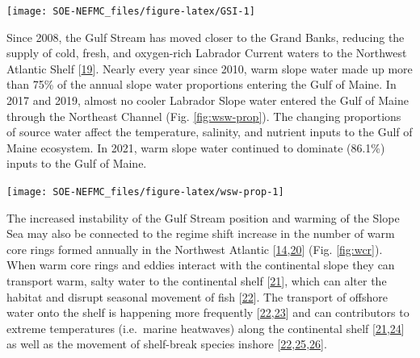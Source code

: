 \documentclass[
  10pt,
]{article}
\let\origfigure\figure
\let\endorigfigure\endfigure
\renewenvironment{figure}[1][2] {
    \expandafter\origfigure\expandafter[H]
} {
    \endorigfigure
}
\begin{document}
\begin{figure}

{\centering \texttt{[image: SOE-NEFMC\_files/figure-latex/GSI-1]} 

}

\caption{Index representing changes in the location of the Gulf Stream north wall. Positive values represent a more northerly Gulf Stream position.}\label{fig:GSI}
\end{figure}

Since 2008, the Gulf Stream has moved closer to the Grand Banks, reducing the supply of cold, fresh, and oxygen-rich Labrador Current waters to the Northwest Atlantic Shelf {[}\protect\hyperlink{ref-goncalves_neto_changes_2021}{19}{]}. Nearly every year since 2010, warm slope water made up more than 75\% of the annual slope water proportions entering the Gulf of Maine. In 2017 and 2019, almost no cooler Labrador Slope water entered the Gulf of Maine through the Northeast Channel (Fig. \ref{fig:wsw-prop}). The changing proportions of source water affect the temperature, salinity, and nutrient inputs to the Gulf of Maine ecosystem. In 2021, warm slope water continued to dominate (86.1\%) inputs to the Gulf of Maine.

\begin{figure}

{\centering \texttt{[image: SOE-NEFMC\_files/figure-latex/wsw-prop-1]} 

}

\caption{Proportion of Warm Slope Water (WSW) and Labrador slope water (LSLW) entering the GOM through the Northeast Channel.}\label{fig:wsw-prop}
\end{figure}

The increased instability of the Gulf Stream position and warming of the Slope Sea may also be connected to the regime shift increase in the number of warm core rings formed annually in the Northwest Atlantic {[}\protect\hyperlink{ref-gangopadhyay_census_2020}{14},\protect\hyperlink{ref-gangopadhyay_observed_2019}{20}{]} (Fig. \ref{fig:wcr}). When warm core rings and eddies interact with the continental slope they can transport warm, salty water to the continental shelf {[}\protect\hyperlink{ref-chen_mesoscale_2022}{21}{]}, which can alter the habitat and disrupt seasonal movement of fish {[}\protect\hyperlink{ref-gawarkiewicz_changing_2018}{22}{]}. The transport of offshore water onto the shelf is happening more frequently {[}\protect\hyperlink{ref-gawarkiewicz_changing_2018}{22},\protect\hyperlink{ref-gawarkiewicz_increasing_nodate}{23}{]} and can contributors to extreme temperatures (i.e.~marine heatwaves) along the continental shelf {[}\protect\hyperlink{ref-chen_mesoscale_2022}{21},\protect\hyperlink{ref-gawarkiewicz_characteristics_2019}{24}{]} as well as the movement of shelf-break species inshore {[}\protect\hyperlink{ref-gawarkiewicz_changing_2018}{22},\protect\hyperlink{ref-potter_horizontal_2011}{25},\protect\hyperlink{ref-worm_predator_2003}{26}{]}.
\end{document}

